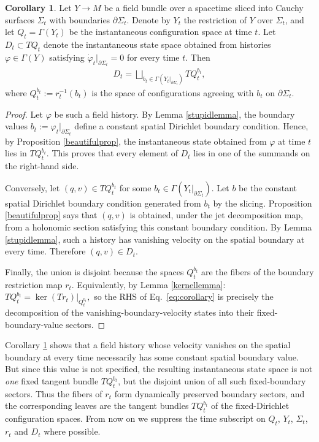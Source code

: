 \documentclass{article}
\theoremstyle{definition}
\newtheorem{corollary}[definition]{Corollary}
\begin{document}
\begin{corollary}\label{funcorollary}
Let $Y\to M$ be a field bundle over a spacetime sliced into Cauchy
surfaces $\Sigma_t$ with boundaries $\partial\Sigma_t$. Denote by
$Y_t$ the restriction of $Y$ over $\Sigma_t$, and let
$Q_t=\Gamma(Y_t)$ be the instantaneous configuration space at time $t$. Let $D_t\subset TQ_t$ denote the instantaneous state space obtained
from histories $\varphi\in\Gamma(Y)$ satisfying $\dot{\varphi}_t|_{\partial\Sigma_t}=0$
for every time $t$. Then
\begin{align}\label{eq:corollary}
    D_t
    =
    \bigsqcup_{b_t\in\Gamma(Y_t|_{\partial\Sigma_t})}
    TQ_t^{b_t},
\end{align}
where $Q_t^{b_t}:=r_t^{-1}(b_t)$
is the space of configurations agreeing with $b_t$ on
$\partial\Sigma_t$.
\end{corollary}

\begin{proof}
Let $\varphi$ be such a field history. By Lemma \ref{stupidlemma}, the boundary
values $b_t:=\varphi_t|_{\partial\Sigma_t}$
define a constant spatial Dirichlet boundary condition. Hence, by
Proposition \ref{beautifulprop}, the instantaneous state obtained from
$\varphi$ at time $t$ lies in $TQ_t^{b_t}$. This proves that every element of $D_t$ lies in one of the summands on
the right-hand side.

Conversely, let $(q,v)\in TQ_t^{b_t}$
for some $b_t\in\Gamma(Y_t|_{\partial\Sigma_t})$. Let $b$ be the
constant spatial Dirichlet boundary condition generated from $b_t$ by
the slicing. Proposition \ref{beautifulprop} says that $(q,v)$ is
obtained, under the jet decomposition map, from a holonomic section
satisfying this constant boundary condition. By Lemma
\ref{stupidlemma}, such a history has vanishing velocity on
the spatial boundary at every time. Therefore $(q,v)\in D_t$.

Finally, the union is disjoint because the spaces $Q_t^{b_t}$ are the
fibers of the boundary restriction map $r_t$. Equivalently, by Lemma
\ref{kernellemma}: $TQ_t^{b_t}
    =
    \ker(Tr_t)|_{Q_t^{b_t}},$ so the RHS of Eq.~\eqref{eq:corollary} is precisely the decomposition of the vanishing-boundary-velocity states into their fixed-boundary-value sectors.
\end{proof}

Corollary \ref{funcorollary} shows that a field history whose velocity vanishes on the spatial boundary at every time necessarily has some constant spatial boundary value. But since this value is not specified, the resulting instantaneous state space is not \textit{one} fixed tangent bundle $TQ_t^{b_t}$, but the disjoint union of all such fixed-boundary sectors. Thus the fibers of $r_t$ form
dynamically preserved boundary sectors, and the corresponding leaves are the tangent bundles $TQ_t^{b_t}$ of the fixed-Dirichlet configuration spaces. From now on we suppress the time subscript on $Q_t$, $Y_t$, $\Sigma_t$, $r_t$ and $D_t$ where possible.
\end{document}
